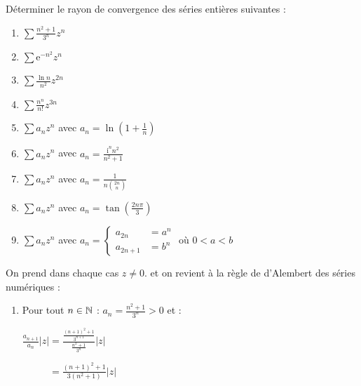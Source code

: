 \documentclass{book}
\begin{document}
\begin{Exercice} 
Déterminer le rayon de convergence des séries entières suivantes :

  	\begin{enumerate}
    \item $\sum\limits {\frac{{n^2 + 1}}{{3^n }}z^n }$
     
    \item $\sum\limits {{\mathrm{e}}^{ - n^2 } z^n }$
     
    \item $\sum\limits {\frac{{\ln n}}{{n^2 }}z^{2n} }$

	\item $ \sum\limits {\frac{{n^n }}{{n!}}z^{3n} }$
	
	\item $ \sum\limits a_n z^{n} $ avec $a_n = \ln \left( 1 + \frac{ 1 }{ n } \right)$	

	\item $ \sum\limits a_n z^{n} $ avec $a_n = \frac{ \mathrm{i}^n n^2 }{ n^2 + 1 }$	
	
	\item $ \sum\limits a_n z^{n} $ avec $a_n = \frac{1}{ n \binom{2n}{n} }$

	\item $ \sum\limits a_n z^{n} $ avec $a_n = \tan \left( \frac{2n \pi}{3} \right)$

	\item $ \sum\limits a_n z^{n} $ avec 
	$a_n = \begin{cases}
	a_{2n} &= a^n \\
	a_{2n+1} &= b^n
	\end{cases}$ où $0<a<b$
  \end{enumerate}
  \begin{Correction}
On prend dans chaque cas $z \neq 0$. et on revient à la règle de d'Alembert des séries numériques :


\begin{enumerate}
\item %
	Pour tout $n \in \mathbb{N}$ : $a_n = \frac{ n^2 + 1 }{ 3^n } > 0$ et :    
    
		\hspace{0.7cm} $\frac{ a_{n+1} }{ a_n } |z| = \frac{ \frac{ (n+1)^2 + 1 }{ 3^{n+1} } }{ \frac{n^2 + 1}{ 3^n }  } |z|$

		\hspace{0.7cm} $\phantom{ \frac{ a_{n+1} }{ a_n } |z| } = \frac{ (n+1)^2 + 1 }{ 3 (n^2 + 1) } |z| $


\end{enumerate}
\end{Correction}
\end{Exercice}
\end{document}
